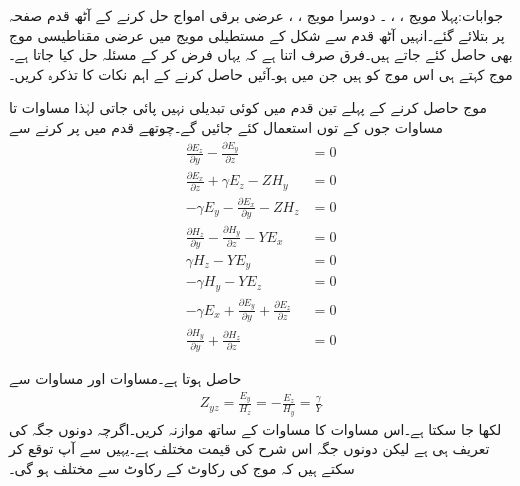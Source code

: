 جوابات:پہلا مویج ، ، ۔ دوسرا مویج ، ، 
عرضی برقی امواج حل کرنے کے آٹھ قدم صفحہ  پر بتلائے گئے۔انہیں آٹھ قدم سے شکل  کے مستطیلی مویج میں  عرضی مقناطیسی موج  بھی حاصل کئے جاتے ہیں۔فرق صرف اتنا ہے کہ یہاں  فرض کر کے مسئلہ حل کیا جاتا ہے۔ موج کہتے ہی اس موج کو ہیں جن میں  ہو۔آئیں  حاصل کرنے کے اہم نکات کا تذکرہ کریں۔

موج حاصل کرنے کے پہلے تین قدم میں کوئی تبدیلی نہیں پائی جاتی لہٰذا مساوات  تا مساوات  جوں کے توں استعمال کئے جائیں گے۔چوتھے قدم میں  پر کرنے سے
\begin{align}
\frac{\partial E_z}{\partial y}-\frac{\partial E_y}{\partial z}&=0   \label{مساوات_مویج_عرضی_مقناطیسی_ب}\\
\frac{\partial E_x}{\partial z}+\gamma E_z-Z H_y&=0  \label{مساوات_مویج_عرضی_مقناطیسی_پ} \\
-\gamma E_y-\frac{\partial E_x}{\partial y}-Z H_z&=0 \label{مساوات_مویج_عرضی_مقناطیسی_ت}\\
\frac{\partial H_z}{\partial y}-\frac{\partial H_y}{\partial z}-YE_x&=0  \label{مساوات_مویج_عرضی_مقناطیسی_ٹ}\\
\gamma H_z-YE_y&=0  \label{مساوات_مویج_عرضی_مقناطیسی_ث}\\
-\gamma H_y-YE_z&=0 \label{مساوات_مویج_عرضی_مقناطیسی_ج}\\
-\gamma E_x+\frac{\partial E_y}{\partial y}+\frac{\partial E_z}{\partial z}&=0  \label{مساوات_مویج_عرضی_مقناطیسی_چ}\\
\frac{\partial H_y}{\partial y}+\frac{\partial H_z}{\partial z}&=0  \label{مساوات_مویج_عرضی_مقناطیسی_ح}
\end{align}

حاصل ہوتا ہے۔مساوات  اور مساوات  سے
\begin{align}\label{مساوات_مویج_عرضی_مقناطیسی_رکاوٹ}
Z_{yz}=\frac{E_y}{H_z}=-\frac{E_z}{H_y}=\frac{\gamma}{Y}
\end{align}
لکھا جا سکتا ہے۔اس مساوات کا مساوات  کے ساتھ موازنہ کریں۔اگرچہ دونوں جگہ   کی تعریف   ہی ہے لیکن دونوں جگہ اس شرح کی قیمت مختلف ہے۔یہیں سے آپ توقع کر سکتے ہیں کہ  موج کی رکاوٹ  کے رکاوٹ سے مختلف ہو گی۔

